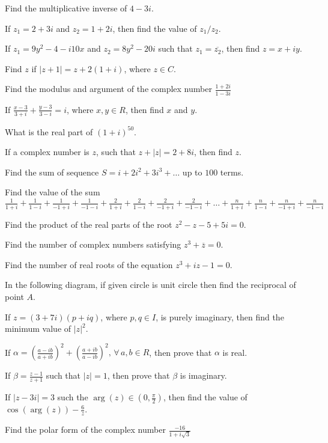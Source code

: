 \item Find the multiplicative inverse of $4 - 3i$.
\item If $z_1 = 2 + 3i$ and $z_2 = 1 + 2i$, then find the value of $z_1/z_2$.
\item If $z_1 = 9y^2 - 4 -i10x$ and $z_2 = 8y^2 -20i$ such that $z_1 = \overline{z_2}$, then find $z = x + iy$.
\item Find $z$ if $|z + 1| = z + 2(1 + i)$, where $z\in C$.
\item Find the modulus and argument of the complex number $\frac{1 + 2i}{1 - 3i}$
\item If $\frac{x - 3}{3 + i} + \frac{y - 3}{3 - i} = i$, where $x, y \in R$, then find $x$ and $y$.
\item What is the real part of $(1 + i)^{50}$.
\item If a complex number is $z$, such that $z + |z| = 2 + 8i$, then find $z$.
\item Find the sum of sequence $S = i + 2i^2 + 3i^3 + \ldots$ up to $100$ terms.
\item Find the value of the sum $\frac{1}{1 + i} + \frac{1}{1 - i} + \frac{1}{-1 + i} + \frac{1}{-1 -i} + \frac{2}{1 + i} +
  \frac{2}{1 - i} + \frac{2}{-1 + i} + \frac{2}{-1 -i} + \ldots + \frac{n}{1 + i} + \frac{n}{1 - i} + \frac{n}{-1 + i} +
  \frac{n}{-1 -i}$
\item Find the product of the real parts of the root $z^2 - z - 5 + 5i = 0$.
\item Find the number of complex numbers satisfying $z^3 + \overline{z} = 0$.
\item Find the number of real roots of the equation $z^3 + iz - 1= 0$.
\item In the following diagram, if given circle is unit circle then find the reciprocal of point $A.$
\item If $z = (3 + 7i)(p + iq)$, where $p, q\in I$, is purely imaginary, then find the minimum value of $|z|^2$.
\item If $\alpha = \left(\frac{a - ib}{a + ib}\right)^2 + \left(\frac{a + ib}{a - ib}\right)^2,\,\forall\,a, b\in R$, then prove that
  $\alpha$ is real.
\item If $\beta = \frac{z - 1}{z + 1}$ such that $|z| = 1$, then prove that $\beta$ is imaginary.
\item If $|z - 3i| = 3$ such the $\arg(z)\in\left(0, \frac{\pi}{2}\right)$, then find the value of $\cos(\arg(z)) - \frac{6}{z}$.
\item Find the polar form of the complex number $\frac{-16}{1 + i\sqrt{3}}$
